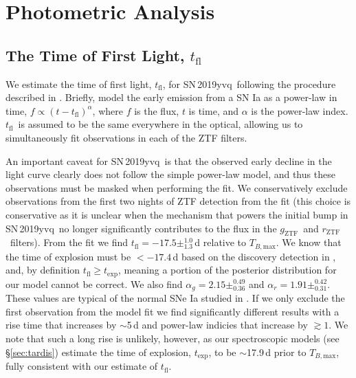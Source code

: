 \documentclass[twocolumn]{aastex63}
\newcommand{\fromkate}[1]{{\color{brown} fromKM: {#1}}}
\newcommand{\rztf}{$r_\mathrm{ZTF}$}
\newcommand{\gztf}{$g_\mathrm{ZTF}$}
\newcommand{\tfl}{$t_\mathrm{fl}$}
\newcommand{\tbmax}{$T_{B,\mathrm{max}}$}
\newcommand{\sn}{SN\,2019yvq}
\begin{document}
\section{Photometric Analysis}\label{sec:phot}

\subsection{The Time of First Light, \tfl}\label{sec:t_fl}

We estimate the time of first light, \tfl, for \sn\ following the procedure
described in \citet{Miller20}. Briefly, \citet{Miller20} model the early
emission from a SN Ia as a power-law in time, $f \propto (t -
t_\mathrm{fl})^\alpha$, where $f$ is the flux, $t$ is time, and $\alpha$ is
the power-law index. \tfl\ is assumed to be the same everywhere in the
optical, allowing us to simultaneously fit observations in each of the ZTF
filters.

An important caveat for \sn\ is that the observed early decline in the light
curve clearly does not follow the simple power-law model, and thus these
observations must be masked when performing the fit. We conservatively exclude
observations from the first two nights of ZTF detection from the fit (this
choice is conservative as it is unclear when the mechanism that powers the
initial bump in \sn\ no longer significantly contributes to the flux in the
\gztf\ and \rztf\ filters). From the fit we find \tfl$ = -17.5
\pm^{1.0}_{1.3}$\,d relative to \tbmax. We know that the time of explosion
must be $< -17.4$\,d based on the discovery detection in \citealt{Itagaki19},
and, by definition $t_\mathrm{fl} \ge t_\mathrm{exp}$, meaning a portion of
the posterior distribution for our model cannot be correct. We also find
$\alpha_g = 2.15 \pm^{0.49}_{0.36}$ and $\alpha_r = 1.91 \pm^{0.42}_{0.31}$.
These values are typical of the normal SNe Ia studied in \citet{Miller20}. If
we only exclude the first observation from the model fit we find significantly
different results with a rise time that increases by $\sim$5\,d and power-law
indicies that increase by $\gtrsim 1$. We note that such a long rise is
unlikely, however, as our spectroscopic models (see \S\ref{sec:tardis})
estimate the time of explosion, $t_\mathrm{exp}$, to be $\sim$17.9\,d prior to
\tbmax, fully consistent with our estimate of \tfl.

\end{document}
